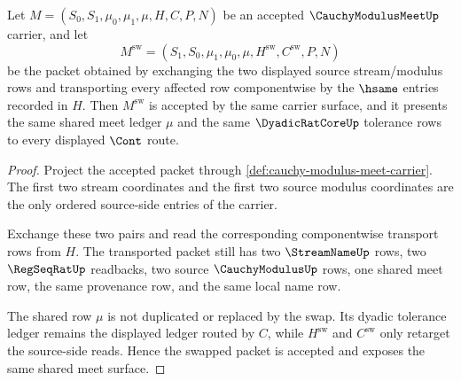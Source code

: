 \begin{theorem}\label{thm:cauchy-modulus-meet-swap-stability}
Let $M=(S_0,S_1,\mu_0,\mu_1,\mu,H,C,P,N)$ be an accepted $\CauchyModulusMeetUp$ carrier, and let
$$
M^{\mathrm{sw}}=(S_1,S_0,\mu_1,\mu_0,\mu,H^{\mathrm{sw}},C^{\mathrm{sw}},P,N)
$$
be the packet obtained by exchanging the two displayed source stream/modulus rows and transporting every affected row componentwise by the $\hsame$ entries recorded in $H$. Then $M^{\mathrm{sw}}$ is accepted by the same carrier surface, and it presents the same shared meet ledger $\mu$ and the same $\DyadicRatCoreUp$ tolerance rows to every displayed $\Cont$ route.
\end{theorem}
\begin{proof}
Project the accepted packet through \autoref{def:cauchy-modulus-meet-carrier}. The first two stream coordinates and the first two source modulus coordinates are the only ordered source-side entries of the carrier.

Exchange these two pairs and read the corresponding componentwise transport rows from $H$. The transported packet still has two $\StreamNameUp$ rows, two $\RegSeqRatUp$ readbacks, two source $\CauchyModulusUp$ rows, one shared meet row, the same provenance row, and the same local name row.

The shared row $\mu$ is not duplicated or replaced by the swap. Its dyadic tolerance ledger remains the displayed ledger routed by $C$, while $H^{\mathrm{sw}}$ and $C^{\mathrm{sw}}$ only retarget the source-side reads. Hence the swapped packet is accepted and exposes the same shared meet surface.
\end{proof}

